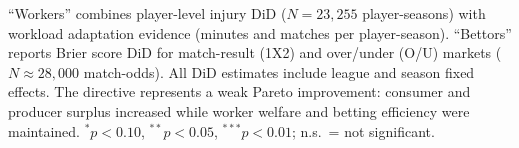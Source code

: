 \begin{table}[htbp]
\begin{threeparttable}
\begin{tablenotes}[flushleft]
``Workers'' combines player-level injury DiD ($N = 23{,}255$ player-seasons) with
workload adaptation evidence (minutes and matches per player-season). ``Bettors'' reports
Brier score DiD for match-result (1X2) and over/under (O/U) markets ($N \approx 28{,}000$
match-odds). All DiD estimates include league and season fixed effects. The directive
represents a weak Pareto improvement: consumer and producer surplus increased while
worker welfare and betting efficiency were maintained. $^{*}p<0.10$, $^{**}p<0.05$,
$^{***}p<0.01$; n.s.\ = not significant.
\end{tablenotes}
\end{threeparttable}
\end{table}
